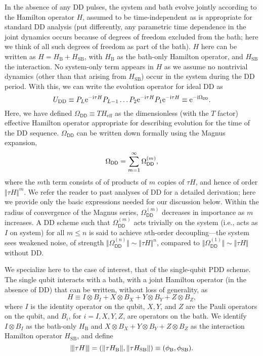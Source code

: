 \documentclass[twocolumn,pra,superscriptaddress]{revtex4-2}
\newcommand{\Odd}{\Omega_{\mathsf{DD}}}
\newcommand{\HB}{H_\mathrm{B}}
\newcommand{\HSB}{H_\mathrm{SB}}
\newcommand{\Heff}{H_\mathrm{eff}}
\newcommand{\phiSB}{\phi_\mathrm{SB}}
\newcommand{\phiB}{\phi_\mathrm{B}}
\begin{document}
In the absence of any DD pulses, the system and bath evolve jointly according to the Hamilton operator $H$, assumed to be time-independent as is appropriate for standard DD analysis (put differently, any parametric time dependence in the joint dynamics occurs because of degrees of freedom excluded from the bath; here we think of all such degrees of freedom as part of the bath). $H$ here can be written as $H=\HB +\HSB$, with $\HB$ as the bath-only Hamilton operator, and $\HSB$ the interaction. No system-only term appears in $H$ as we assume no nontrivial dynamics (other than that arising from $\HSB$) occur in the system during the DD period. With this, we can write the evolution operator for ideal DD as
\begin{equation}\label{eq:Udd}
U_\mathrm{DD}\equiv P_L\upe^{-\upi\tau H}P_{L-1}\ldots P_2\upe^{-\upi\tau H}P_1\upe^{-\upi\tau H}\equiv\upe^{-\upi\Odd}.
\end{equation}
Here, we have defined $\Odd\equiv T\Heff $ as the dimensionless (with the $T$ factor) effective Hamilton operator appropriate for describing evolution for the time of the DD sequence.
$\Odd$ can be written down formally using the Magnus expansion,
\begin{equation}\label{eq:Oeff Magnus series}
\Odd  = \sum_{m=1}^\infty \Odd\up{m},
\end{equation}
where the $m$th term consists of of products of $m$ copies of $\tau H$, and hence of order $\Vert \tau H \Vert^m$. We refer the reader to past analyses of DD  for a detailed derivation; here we provide only the basic expressions needed for our discussion below. \blue{(Add back a bit of the derivation of the $\Odd^{(1)}$ and $\Odd^{(2)}$ terms.)} Within the radius of convergence of the Magnus series, $\Odd^{(m)}$ decreases in importance as $m$ increases. A DD scheme such that $\Odd^{(m)}$ acts trivially on the system (i.e., acts as $I$ on system) for all $m\leq n$ is said to achieve $n$th-order decoupling---the system sees weakened noise, of strength $\Vert\Odd^{(n)}\Vert\sim\Vert \tau H\Vert^n$, compared to $\Vert\Odd^{(1)}\Vert\sim\Vert \tau H\Vert$ without DD.

We specialize here to the case of interest, that of the single-qubit PDD scheme. The single qubit interacts with a bath, with a joint Hamilton operator (in the absence of DD) that can be written, without loss of generality, as
\begin{equation}
H\equiv I\otimes B_I+X\otimes B_X+Y\otimes B_Y+Z\otimes B_Z,
\end{equation}
where $I$ is the identity operator on the qubit, $X,Y$, and $Z$ are the Pauli operators on the qubit, and $B_i$, for $i=I,X,Y,Z$, are operators on the bath. We identify $I\otimes B_I$ as the bath-only $H_\mathrm{B}$ and $X\otimes B_X+Y\otimes B_Y+Z\otimes B_Z$ as the interaction Hamilton operator $H_\mathrm{SB}$, and define
\begin{equation}
\opnorm{\tau H}=(\Vert\tau H_\mathrm{B}\Vert,\Vert\tau H_\mathrm{SB}\Vert)\equiv (\phiB,\phiSB).
\end{equation}
\end{document}
